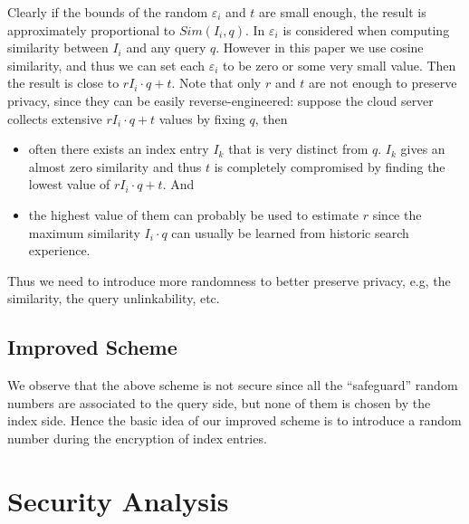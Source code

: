 \documentclass{IEEEtran}
\begin{document}
Clearly if the bounds of the random $\varepsilon_i$ and $t$ are small enough, the result is approximately proportional to $Sim(I_i, q)$. In \cite{Cao14} $\varepsilon_i$ is considered when computing similarity between $I_i$ and any query $q$. However in this paper we use cosine similarity, and thus we can set each $\varepsilon_i$ to be zero or some very small value. Then the result is close to $rI_i\cdot q+t$. 
Note that only $r$ and $t$ are not enough to preserve privacy, since they can be easily reverse-engineered: suppose the cloud server collects extensive $rI_i\cdot q+t$ values by fixing $q$, then
\begin{itemize}
\item often there exists an index entry $I_k$ that is very distinct from $q$. $I_k$ gives an almost zero similarity and thus $t$ is completely compromised by finding the lowest value of $rI_i\cdot q+t$. And
\item the highest value of them can probably be used to estimate $r$ since the maximum similarity $I_i\cdot q$ can usually be learned from historic search experience. 
\end{itemize}
Thus we need to introduce more randomness to better preserve privacy, e.g, the similarity, the query unlinkability, etc.

\subsection{Improved Scheme}
We observe that the above scheme is not secure since all the ``safeguard'' random numbers are associated to the query side, but none of them is chosen by the index side. Hence the basic idea of our improved scheme is to introduce a random number during the encryption of index entries.


\section{Security Analysis}



\end{document}
